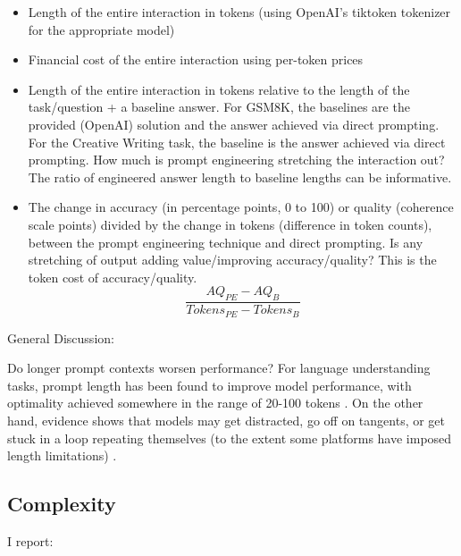 \documentclass[11pt]{article}
\begin{document}
\begin{itemize}
  \item Length of the entire interaction in tokens (using OpenAI's tiktoken tokenizer for the appropriate model)
  \item Financial cost of the entire interaction using per-token prices
  \item Length of the entire interaction in tokens relative to the length of the task/question + a baseline answer. For GSM8K, the baselines are the provided (OpenAI) solution and the answer achieved via direct prompting. For the Creative Writing task, the baseline is the answer achieved via direct prompting. How much is prompt engineering stretching the interaction out? The ratio of engineered answer length to baseline lengths can be informative.
  \item The change in accuracy (in percentage points, 0 to 100) or quality (coherence scale points) divided by the change in tokens (difference in token counts), between the prompt engineering technique and direct prompting. Is any stretching of output adding value/improving accuracy/quality? This is the token cost of accuracy/quality.
  \begin{displaymath}
    \frac{AQ_{PE} - AQ_{B}}{Tokens_{PE} - Tokens_{B}}
  \end{displaymath}
\end{itemize}

General Discussion:

Do longer prompt contexts worsen performance? For language understanding tasks, prompt length has been found to improve model performance, with optimality achieved somewhere in the range of 20-100 tokens \cite{lester_power_2021}. On the other hand, evidence shows that models may get distracted, go off on tangents, or get stuck in a loop repeating themselves (to the extent some platforms have imposed length limitations) \cite{shi_large_2023, mann_microsoft_nodate}. 

\subsection*{Complexity}

I report:
\end{document}
